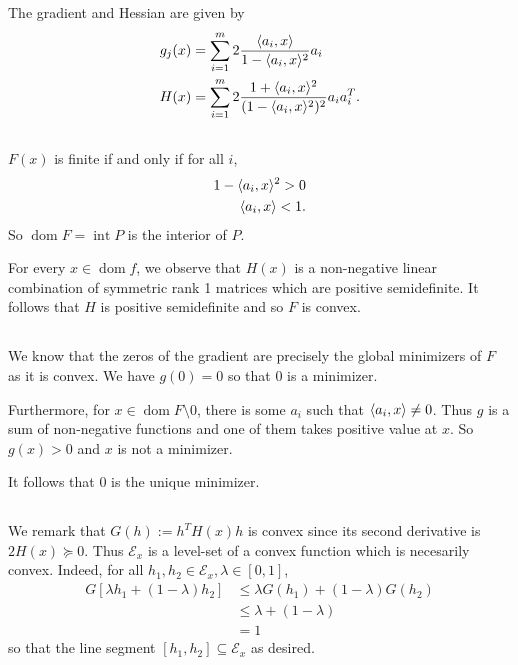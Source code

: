 \documentclass[10pt]{article}
\DeclarePairedDelimiter{\iprod}{\langle}{\rangle}
\let\abs\relax
\DeclarePairedDelimiter{\abs}{\lvert}{\rvert}
\DeclareMathOperator{\Int}{int}
\DeclareMathOperator{\dom}{dom}
\newcommand{\sset}{\subseteq}
\newcommand{\mcal}{\mathcal}
\begin{document}
\subsection{}
The gradient and Hessian are given by
\begin{align*}
  g_j(x)
  &= \sum_{i=1}^m 2\frac{\iprod{a_i, x}}{1- \iprod{a_i, x}^2}a_i \\
  H(x)
  &= \sum_{i=1}^m 2\frac{1+\iprod{a_i, x}^2}{(1-\iprod{a_i, x}^2)^2} a_ia_i^T.
\end{align*}

\subsection{}
$F(x)$ is finite if and only if for all $i$,
\begin{align*}
  1-\iprod{a_i, x}^2 > 0 \\
  \abs{\iprod{a_i, x}} < 1.
\end{align*}
So $\dom F = \Int P$ is the interior of $P$.

For every $x\in \dom f$,
we observe that $H(x)$ is a non-negative linear combination of symmetric rank 1 matrices
which are positive semidefinite.
It follows that $H$ is positive semidefinite
and so $F$ is convex.

\subsection{}
We know that the zeros of the gradient
are precisely the global minimizers of $F$ as it is convex.
We have $g(0) = 0$ so that 0 is a minimizer.

Furthermore,
for $x\in \dom F\setminus 0$,
there is some $a_i$ such that $\iprod{a_i, x}\neq 0$.
Thus $g$ is a sum of non-negative functions
and one of them takes positive value at $x$.
So $g(x) > 0$ and $x$ is not a minimizer.

It follows that 0 is the unique minimizer.

\subsection{}
We remark that $G(h) := h^TH(x) h$ is convex since its second derivative is $2H(x)\succeq 0$.
Thus $\mcal E_x$ is a level-set of a convex function which is necesarily convex.
Indeed, for all $h_1, h_2\in \mcal E_x, \lambda\in [0, 1]$,
\begin{align*}
  G[\lambda h_1 + (1-\lambda) h_2]
  &\leq \lambda G(h_1) + (1-\lambda) G(h_2) \\
  &\leq \lambda + (1-\lambda) \\
  &= 1
\end{align*}
so that the line segment $[h_1, h_2]\sset \mcal E_x$ as desired.
\end{document}
